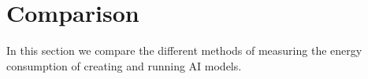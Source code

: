 \section{Comparison}

In this section we compare the different methods of measuring the energy consumption
of creating and running AI models.